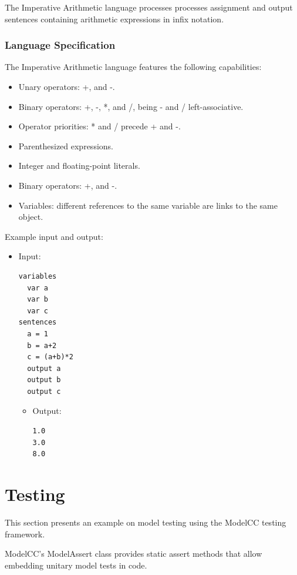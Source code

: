 \documentclass[a4paper,twoside,onecolumn]{article}
\begin{document}
The Imperative Arithmetic language processes processes assignment and output sentences containing arithmetic expressions in infix notation.

\subsubsection{Language Specification}
The Imperative Arithmetic language features the following capabilities:

\begin{itemize}
\item Unary operators: +, and -.
\item Binary operators: +, -, *, and /, being - and / left-associative.
\item Operator priorities: * and / precede + and -.
\item Parenthesized expressions.
\item Integer and floating-point literals.
\item Binary operators: +, and -.
\item Variables: different references to the same variable are links to the same object.
\end{itemize}

Example input and output:

\begin{itemize}
\item Input:
\begin{verbatim}
variables
  var a
  var b
  var c
sentences
  a = 1
  b = a+2
  c = (a+b)*2
  output a
  output b
  output c
\end{verbatim}
\begin{itemize} \item Output:
\begin{verbatim}
1.0
3.0
8.0
\end{verbatim}
\end{itemize}
\end{itemize}

\section{Testing} \label{sec:examples}

This section presents an example on model testing using the ModelCC testing framework.

ModelCC's ModelAssert class provides static assert methods that allow embedding unitary model tests in code.
\end{document}
